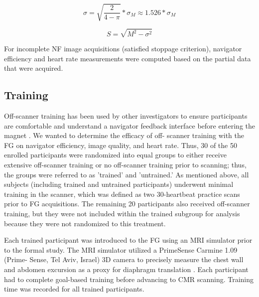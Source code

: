 \begin{equation}
	\label{eqn:sigma}
	\sigma = \sqrt{\frac{2}{4-\pi}}*\sigma_M \approx 1.526*\sigma_M
\end{equation}

\begin{equation}
	\label{eqn:corrected_signal}
	S= \sqrt{M^2-\sigma^2}
\end{equation}

	For incomplete NF image acquisitions (satisfied stoppage criterion), navigator efficiency and heart rate measurements were computed based on the partial data that were acquired.

\subsection{Training}
	Off-scanner training has been used by other investigators to ensure participants are comfortable and understand a navigator feedback interface before entering the magnet \cite{Feuerlein2009}. We wanted to determine the efficacy of off- scanner training with the FG on navigator efficiency, image quality, and heart rate. Thus, 30 of the 50 enrolled participants were randomized into equal groups to either receive extensive off-scanner training or no off-scanner training prior to scanning; thus, the groups were referred to as 'trained' and 'untrained.' As mentioned above, all subjects (including trained and untrained participants) underwent minimal training in the scanner, which was defined as two 30-heartbeat practice scans prior to FG acquisitions. The remaining 20 participants also received off-scanner training, but they were not included within the trained subgroup for analysis because they were not randomized to this treatment.
	
	Each trained participant was introduced to the FG using	an MRI simulator prior to the formal study. The MRI simulator utilized a PrimeSense Carmine 1.09 (Prime- Sense, Tel Aviv, Israel) 3D camera to precisely measure the chest wall and abdomen excursion as a proxy for diaphragm translation \cite{Harte2016,Heß2015}. Each participant had to complete goal-based training before advancing to CMR scanning. Training time was recorded for all trained participants.
	

